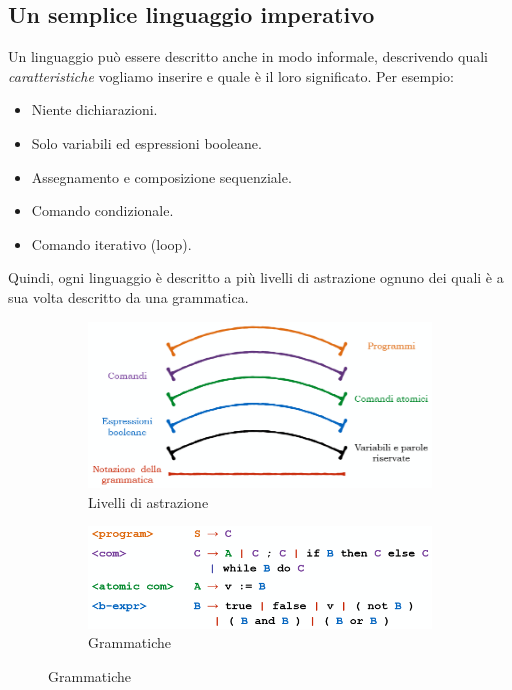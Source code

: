 \documentclass[a4paper,oneside,titlepage]{book}
\begin{document}
\subsection{Un semplice linguaggio imperativo}
Un linguaggio può essere descritto anche in modo informale, descrivendo quali \textit{caratteristiche} vogliamo inserire e quale è il loro significato. Per esempio:
\begin{itemize}
	\item Niente dichiarazioni.
	\item Solo variabili ed espressioni booleane.
	\item Assegnamento e composizione sequenziale.
	\item Comando condizionale.
	\item Comando iterativo (loop).
\end{itemize}
Quindi, ogni linguaggio è descritto a più livelli di astrazione ognuno dei quali è a sua volta descritto da una grammatica.
\begin{figure}[htp]
	\begin{subfigure}{0.49\textwidth}
		\includegraphics[width=\textwidth, height=\textheight, keepaspectratio]{imp1.png} 
		\caption{Livelli di astrazione}
	\end{subfigure}
	\hfill
	\begin{subfigure}{0.49\textwidth}
		\includegraphics[width=\textwidth, height=\textheight, keepaspectratio]{imp2.png}
		\caption{Grammatiche}
	\end{subfigure}
\end{figure}
\end{document}

